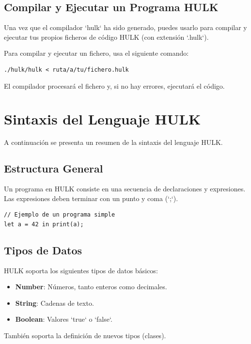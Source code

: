 \documentclass{article}
\begin{document}
\subsection{Compilar y Ejecutar un Programa HULK}

Una vez que el compilador `hulk` ha sido generado, puedes usarlo para compilar y ejecutar tus propios ficheros de código HULK (con extensión `.hulk`).

Para compilar y ejecutar un fichero, usa el siguiente comando:

\begin{verbatim}
./hulk/hulk < ruta/a/tu/fichero.hulk
\end{verbatim}

El compilador procesará el fichero y, si no hay errores, ejecutará el código.

\section{Sintaxis del Lenguaje HULK}

A continuación se presenta un resumen de la sintaxis del lenguaje HULK.

\subsection{Estructura General}

Un programa en HULK consiste en una secuencia de declaraciones y expresiones. Las expresiones deben terminar con un punto y coma (`;`).

\begin{verbatim}
// Ejemplo de un programa simple
let a = 42 in print(a);
\end{verbatim}

\subsection{Tipos de Datos}

HULK soporta los siguientes tipos de datos básicos:
\begin{itemize}
    \item \textbf{Number}: Números, tanto enteros como decimales.
    \item \textbf{String}: Cadenas de texto.
    \item \textbf{Boolean}: Valores `true` o `false`.
\end{itemize}

También soporta la definición de nuevos tipos (clases).
\end{document}
